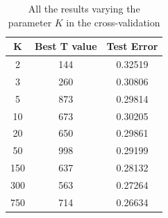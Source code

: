 \begin{table}
\centering
\begin{tabular}{|c|c|c|}
	\hline
	K & Best T value & Test Error \\
	\hline
	2 & 144 & 0.32519 \\
	\hline
	3 & 260 & 0.30806 \\
	\hline
	5 & 873 & 0.29814 \\
	\hline
	10 & 673 & 0.30205 \\
	\hline
	20 & 650 & 0.29861 \\
	\hline
	50 & 998 & 0.29199 \\
	\hline
	150 & 637 & 0.28132 \\
	\hline
	300 & 563 & 0.27264 \\
	\hline
	750 & 714 & 0.26634 \\
	\hline
\end{tabular}
\caption{All the results varying the parameter $K$ in the cross-validation}
\label{tab:results}
\end{table}
